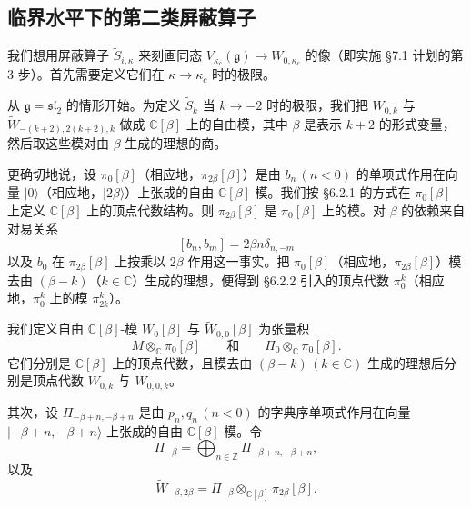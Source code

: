 
\subsection{临界水平下的第二类屏蔽算子}

我们想用屏蔽算子 $\widetilde{S}_{i,\kappa}$ 来刻画同态 $V_{\kappa_c}(\mathfrak{g})\to W_{0,\kappa_c}$ 的像（即实施 §7.1 计划的第 3 步）。首先需要定义它们在 $\kappa\to\kappa_c$ 时的极限。

从 $\mathfrak{g}=\mathfrak{sl}_2$ 的情形开始。为定义 $\widetilde{S}_k$ 当 $k\to-2$ 时的极限，我们把 $W_{0,k}$ 与 $\widetilde{W}_{-(k+2),2(k+2),k}$ 做成 $\mathbb{C}[\beta]$ 上的自由模，其中 $\beta$ 是表示 $k+2$ 的形式变量，然后取这些模对由 $\beta$ 生成的理想的商。

更确切地说，设 $\pi_0[\beta]$（相应地，$\pi_{2\beta}[\beta]$）是由 $b_n\,(n<0)$ 的单项式作用在向量 $|0\rangle$（相应地，$|2\beta\rangle$）上张成的自由 $\mathbb{C}[\beta]$-模。我们按 §6.2.1 的方式在 $\pi_0[\beta]$ 上定义 $\mathbb{C}[\beta]$ 上的顶点代数结构。则 $\pi_{2\beta}[\beta]$ 是 $\pi_0[\beta]$ 上的模。对 $\beta$ 的依赖来自对易关系
\[
    [b_n,b_m]=2\beta n\delta_{n,-m}
\]
以及 $b_0$ 在 $\pi_{2\beta}[\beta]$ 上按乘以 $2\beta$ 作用这一事实。把 $\pi_0[\beta]$（相应地，$\pi_{2\beta}[\beta]$）模去由 $(\beta-k)$（$k\in\mathbb{C}$）生成的理想，便得到 §6.2.2 引入的顶点代数 $\pi_0^k$（相应地，$\pi_0^k$ 上的模 $\pi_{2k}^k$）。

我们定义自由 $\mathbb{C}[\beta]$-模 $W_0[\beta]$ 与 $\widetilde{W}_{0,0}[\beta]$ 为张量积
\[
    M\otimes_{\mathbb{C}}\pi_0[\beta]\qquad\text{和}\qquad\Pi_0\otimes_{\mathbb{C}}\pi_0[\beta].
\]
它们分别是 $\mathbb{C}[\beta]$ 上的顶点代数，且模去由 $(\beta-k)\,(k\in\mathbb{C})$ 生成的理想后分别是顶点代数 $W_{0,k}$ 与 $\widetilde{W}_{0,0,k}$。

其次，设 $\Pi_{-\beta+n,-\beta+n}$ 是由 $p_n,q_n\,(n<0)$ 的字典序单项式作用在向量 $|-\beta+n,-\beta+n\rangle$ 上张成的自由 $\mathbb{C}[\beta]$-模。令
\[
    \Pi_{-\beta}=\bigoplus_{n\in\mathbb{Z}}\Pi_{-\beta+n,-\beta+n},
\]
以及
\[
    \widetilde{W}_{-\beta,2\beta}=\Pi_{-\beta}\otimes_{\mathbb{C}[\beta]}\pi_{2\beta}[\beta].
\]

